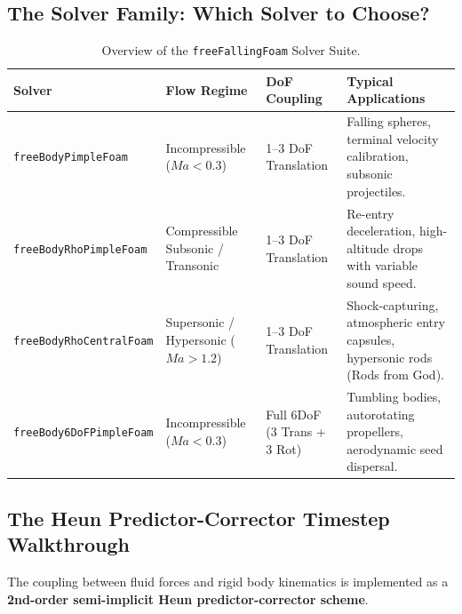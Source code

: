 \documentclass[11pt,a4paper]{article}
\begin{document}
\subsection{The Solver Family: Which Solver to Choose?}
\begin{table}[H]
    \centering
    \small
    \caption{Overview of the \texttt{freeFallingFoam} Solver Suite.}
    \label{tab:solver_matrix}
    \begin{tabularx}{\textwidth}{l p{2.8cm} p{2.8cm} X}
        \toprule
        \textbf{Solver} & \textbf{Flow Regime} & \textbf{DoF Coupling} & \textbf{Typical Applications} \\
        \midrule
        \texttt{freeBodyPimpleFoam} & Incompressible ($Ma < 0.3$) & 1--3 DoF Translation & Falling spheres, terminal velocity calibration, subsonic projectiles. \\
        \texttt{freeBodyRhoPimpleFoam} & Compressible Subsonic / Transonic & 1--3 DoF Translation & Re-entry deceleration, high-altitude drops with variable sound speed. \\
        \texttt{freeBodyRhoCentralFoam} & Supersonic / Hypersonic ($Ma > 1.2$) & 1--3 DoF Translation & Shock-capturing, atmospheric entry capsules, hypersonic rods (Rods from God). \\
        \texttt{freeBody6DoFPimpleFoam} & Incompressible ($Ma < 0.3$) & Full 6DoF (3 Trans + 3 Rot) & Tumbling bodies, autorotating propellers, aerodynamic seed dispersal. \\
        \bottomrule
    \end{tabularx}
\end{table}

\subsection{The Heun Predictor-Corrector Timestep Walkthrough}
The coupling between fluid forces and rigid body kinematics is implemented as a \textbf{2nd-order semi-implicit Heun predictor-corrector scheme}. 
\end{document}
